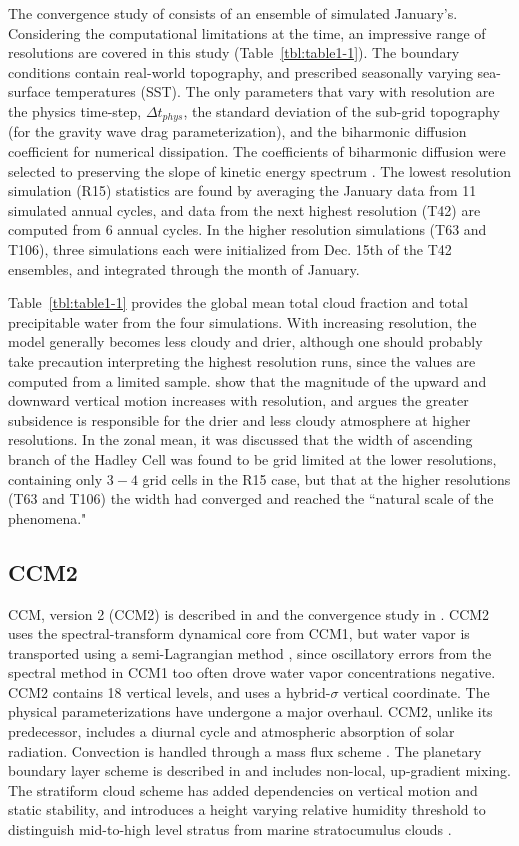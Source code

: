 The convergence study of \cite{KW1991JGR} consists of an ensemble of simulated January's. Considering the computational limitations at the time, an impressive range of resolutions are covered in this study (Table~\ref{tbl:table1-1}). The boundary conditions contain real-world topography, and prescribed seasonally varying sea-surface temperatures (SST). The only parameters that vary with resolution are the physics time-step, $\Delta t_{phys}$, the standard deviation of the sub-grid topography (for the gravity wave drag parameterization), and the biharmonic diffusion coefficient for numerical dissipation. The coefficients of biharmonic diffusion were selected to preserving the slope of kinetic energy spectrum \citep[see][]{B1991JCLIM}. The lowest resolution simulation (R15) statistics are found by averaging the January data from 11 simulated annual cycles, and data from the next highest resolution (T42) are computed from 6 annual cycles. In the higher resolution simulations (T63 and T106), three simulations each were initialized from Dec. 15th of the T42 ensembles, and integrated through the month of January.

Table~\ref{tbl:table1-1} provides the global mean total cloud fraction and total precipitable water from the four simulations. With increasing resolution, the model generally becomes less cloudy and drier, although one should probably take precaution interpreting the highest resolution runs, since the values are computed from a limited sample. \cite{KW1991JGR} show that the magnitude of the upward and downward vertical motion increases with resolution, and argues the greater subsidence is responsible for the drier and less cloudy atmosphere at higher resolutions. In the zonal mean, it was discussed that the width of ascending branch of the Hadley Cell was found to be grid limited at the lower resolutions, containing only $3-4$ grid cells in the R15 case, but that at the higher resolutions (T63 and T106) the width had converged and reached the ``natural scale of the phenomena."

\subsection{CCM2}

CCM, version 2 (CCM2) is described in \cite{CCM2} and the convergence study in \cite{WETAL1995CD}. CCM2 uses the spectral-transform dynamical core from CCM1, but water vapor is transported using a semi-Lagrangian method \citep{WR1994TELLUS}, since oscillatory errors from the spectral method in CCM1 too often drove water vapor concentrations negative. CCM2 contains 18 vertical levels, and uses a hybrid-$\sigma$ vertical coordinate. The physical parameterizations have undergone a major overhaul. CCM2, unlike its predecessor, includes a diurnal cycle and atmospheric absorption of solar radiation. Convection is handled through a mass flux scheme \citep{H1994JGR}. The planetary boundary layer scheme is described in \cite{HB1993JCLIM} and includes non-local, up-gradient mixing. The stratiform cloud scheme has added dependencies on vertical motion and static stability, and introduces a height varying relative humidity threshold to distinguish mid-to-high level stratus from marine stratocumulus clouds \citep{KETAL1994JGR}.

